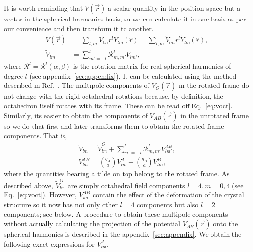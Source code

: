 \documentclass[a4paper,prb,twocolumn]{revtex4-1}  %
\newcommand{\az}[1]{{\color{magenta}{#1}}} %
\begin{document}
It is worth reminding that
$V(\vec r) $ a scalar quantity in the position space but a vector 
in the spherical harmonics basis, so
we can calculate it in one basis as per our convenience and then transform it to another.
\begin{align}
V(\vec r) &= \sum_{l,m} V_{lm} r^l Y_{lm}(\hat r)
= \sum_{l,m} \tilde V_{lm} r^l \tilde Y_{lm}(\hat r),\\
\tilde V_{lm} &= \sum_{m'=-l}^{l}\mathcal{R}^{l}_{m,m'}V_{lm'},
\end{align}
where 
$\mathcal{R}^{l}=\mathcal{R}^{l}(\alpha,\beta)$ is the rotation matrix for real spherical harmonics 
of degree $l$ (see appendix~\ref{sec:appendix}).
It can be calculated using the method described in Ref.~\cite{IvanicJPC96}.
\az{next para?}
The multipole components of $V_O(\vec r)$ in the rotated frame do not change with the rigid octahedral rotations because, by definition, the octahedron itself rotates with its frame.
These can be read off Eq.~\ref{eq:voct}.
Similarly, its easier to obtain the components of $V_{AB}(\vec r)$
in the unrotated frame so we do that first and later transforms them to obtain the rotated frame components.
That is,
\begin{gather}
\tilde V_{lm} = \tilde V_{lm}^O + \sum_{m'=-l}^{l}\mathcal{R}^{l}_{m,m'} V_{lm'}^{AB},\\
V_{lm}^{AB} = \left(\frac{q_A}{a} \right)V_{lm}^{A}   
+ \left(\frac{q_B}{a}\right)V_{lm}^{B},
\end{gather}
where the quantities bearing a tilde on top belong to the rotated frame.
As described above, 
$\tilde V_{lm}^O$ are simply octahedral field components $l=4,m=0,4$ (see Eq.~\ref{eq:voct}).
However, $V_{lm}^{AB}$ contain the effect of the deformation of the crystal structure 
so it now has not only other $l=4$ components but also $l=2$ components; see below.
A procedure to obtain these multipole components without
actually calculating the projection of the potential $V_{AB}(\vec r)$ 
onto the spherical harmonics is described in the appendix~\ref{sec:appendix}.
We obtain the following exact expressions for $V_{lm}^{A}$,
\end{document}
